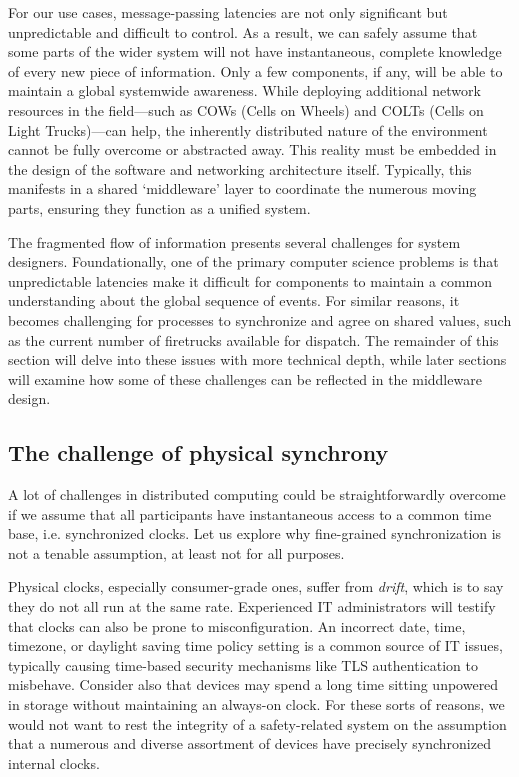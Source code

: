 \documentclass[]             %
{NASA}                       %
\theoremstyle{definition}
\begin{document}
For our use cases, message-passing latencies are not only significant
but unpredictable and difficult to control. As a result, we can safely
assume that some parts of the wider system will not have
instantaneous, complete knowledge of every new piece of
information. Only a few components, if any, will be able to maintain a
global systemwide awareness. While deploying additional network
resources in the field—such as COWs (Cells on Wheels) and COLTs (Cells
on Light Trucks)—can help, the inherently distributed nature of the
environment cannot be fully overcome or abstracted away. This reality
must be embedded in the design of the software and networking
architecture itself. Typically, this manifests in a shared
`middleware' layer to coordinate the numerous moving parts, ensuring
they function as a unified system.

The fragmented flow of information presents several challenges for
system designers. Foundationally, one of the primary computer science
problems is that unpredictable latencies make it difficult for
components to maintain a common understanding about the global
sequence of events. For similar reasons, it becomes challenging for
processes to synchronize and agree on shared values, such as the
current number of firetrucks available for dispatch. The remainder of
this section will delve into these issues with more technical depth,
while later sections will examine how some of these challenges can be
reflected in the middleware design.

\subsection{The challenge of physical  synchrony}
\label{ssec:causality}
A lot of challenges in distributed computing could be
straightforwardly overcome if we assume that all participants have
instantaneous access to a common time base, i.e.  synchronized
clocks. Let us explore why fine-grained synchronization is not a
tenable assumption, at least not for all purposes.

Physical clocks, especially consumer-grade ones, suffer from
\emph{drift}, which is to say they do not all run at the same
rate. Experienced IT administrators will testify that clocks can also
be prone to misconfiguration. An incorrect date, time, timezone, or
daylight saving time policy setting is a common source of IT issues,
typically causing time-based security mechanisms like TLS
authentication \citationneeded to misbehave. Consider also that
devices may spend a long time sitting unpowered in storage without
maintaining an always-on clock. For these sorts of reasons, we would
not want to rest the integrity of a safety-related system on the
assumption that a numerous and diverse assortment of devices have
precisely synchronized internal clocks.
\end{document}
